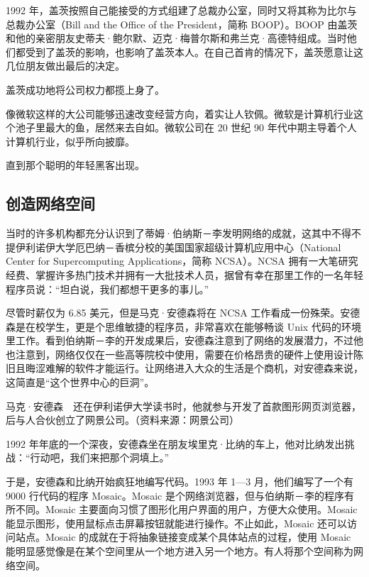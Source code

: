 \documentclass[12pt,UTF8]{ctexbook}
\begin{document}
1992 年，盖茨按照自己能接受的方式组建了总裁办公室，同时又将其称为比尔与总裁办公室（Bill and the Office of the President，简称 BOOP）。BOOP 由盖茨和他的亲密朋友史蒂夫·鲍尔默、迈克·梅普尔斯和弗兰克·高德特组成。当时他们都受到了盖茨的影响，也影响了盖茨本人。在自己首肯的情况下，盖茨愿意让这几位朋友做出最后的决定。

盖茨成功地将公司权力都揽上身了。

像微软这样的大公司能够迅速改变经营方向，着实让人钦佩。微软是计算机行业这个池子里最大的鱼，居然来去自如。微软公司在 20 世纪 90 年代中期主导着个人计算机行业，似乎所向披靡。

直到那个聪明的年轻黑客出现。





\subsection{创造网络空间}


当时的许多机构都充分认识到了蒂姆·伯纳斯－李发明网络的成就，这其中不得不提伊利诺伊大学厄巴纳－香槟分校的美国国家超级计算机应用中心（National Center for Supercomputing Applications，简称 NCSA）。NCSA 拥有一大笔研究经费、掌握许多热门技术并拥有一大批技术人员，据曾有幸在那里工作的一名年轻程序员说：“坦白说，我们都想干更多的事儿。”

尽管时薪仅为 6.85 美元，但是马克·安德森将在 NCSA 工作看成一份殊荣。安德森是在校学生，更是个思维敏捷的程序员，非常喜欢在能够畅谈 Unix 代码的环境里工作。看到伯纳斯－李的开发成果后，安德森注意到了网络的发展潜力，不过他也注意到，网络仅仅在一些高等院校中使用，需要在价格昂贵的硬件上使用设计陈旧且晦涩难解的软件才能运行。让网络进入大众的生活是个商机，对安德森来说，这简直是“这个世界中心的巨洞”。



马克·安德森　还在伊利诺伊大学读书时，他就参与开发了首款图形网页浏览器，后与人合伙创立了网景公司。（资料来源：网景公司）

1992 年年底的一个深夜，安德森坐在朋友埃里克·比纳的车上，他对比纳发出挑战：“行动吧，我们来把那个洞填上。”

于是，安德森和比纳开始疯狂地编写代码。1993 年 1—3 月，他们编写了一个有 9000 行代码的程序 Mosaic。Mosaic 是个网络浏览器，但与伯纳斯－李的程序有所不同。Mosaic 主要面向习惯了图形化用户界面的用户，方便大众使用。Mosaic 能显示图形，使用鼠标点击屏幕按钮就能进行操作。不止如此，Mosaic 还可以访问站点。Mosaic 的成就在于将抽象链接变成某个具体站点的过程，使用 Mosaic 能明显感觉像是在某个空间里从一个地方进入另一个地方。有人将那个空间称为网络空间。
\end{document}
